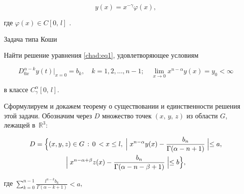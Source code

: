 \begin{equation}

\label{chad:eq2}

y\left(x\right)=x^{-\gamma}\varphi\left(x\right), 

\end{equation}

где $\varphi\left(x\right)\in C\left[ 0, \,  l\right]$ \cite{chadaev:3}.



\begin{newthm}{Задача типа Коши}

Найти решение уравнения \eqref{chad:eq1},  удовлетворяющее условиям

\begin{equation}

\label{chad:eq3}


D_{0x}^{\alpha-k} y(t)\big|_{x=0} =b_k,  \quad k=1,  2,  \dots,  n-1; \quad

\underset{x \to 0}{\lim} x^{n-\alpha} y(x)=y_0 < \infty


\end{equation}

в классе $C_\gamma^\alpha\left[ 0, \,  l\right]$.

\end{newthm}



Сформулируем и докажем теорему о существовании	 и  единственности решения этой задачи. Обозначим через $D$ множество точек $(x, \, y, \, z)$ из области $G$,  лежащей в~$\mathbb R^3$:

\begin{multline*}


D=\Bigl\{(x, y, z)\in G\, :\, 0\, <x\leq l, \; \Bigm|x^{n-\alpha}y(x)-\frac{b_n}{\Gamma(\alpha -n+1)}\Bigm|\leq a,  

\\ 

\Bigm|x^{n-\alpha+\beta}z(x)-\frac {b_n}{\Gamma(\alpha -n-\beta+1)}\Bigm|\leq b\Bigl\}, 

\end{multline*}

где $

\sum_{k=0}^{n-1} \frac{l^{n-k}b_k}{\Gamma (\alpha -k+1)}<a$, 

